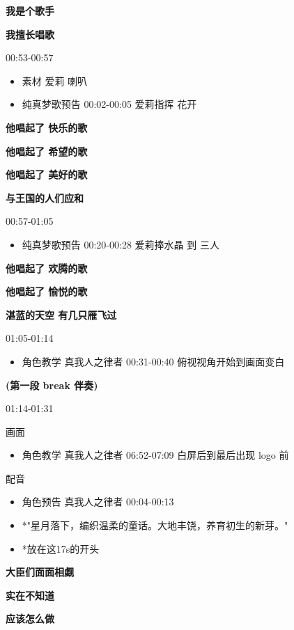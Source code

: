 \documentclass[a4paper]{article}
\begin{document}
\textbf{我是个歌手}

\textbf{我擅长唱歌}

00:53-00:57

\begin{itemize}
    \item 素材 爱莉 喇叭
    \item 纯真梦歌预告 00:02-00:05 爱莉指挥 花开
\end{itemize}

\textbf{他唱起了 快乐的歌}

\textbf{他唱起了 希望的歌}

\textbf{他唱起了 美好的歌}

\textbf{与王国的人们应和}

00:57-01:05

\begin{itemize}
    \item 纯真梦歌预告 00:20-00:28 爱莉捧水晶 到 三人
\end{itemize}

\textbf{他唱起了 欢腾的歌}

\textbf{他唱起了 愉悦的歌}

\textbf{湛蓝的天空 有几只雁飞过}

01:05-01:14

\begin{itemize}
    \item 角色教学 真我人之律者 00:31-00:40 俯视视角开始到画面变白
\end{itemize}

\textbf{(第一段 break 伴奏)}

01:14-01:31

画面

\begin{itemize}
    \item 角色教学 真我人之律者 06:52-07:09 白屏后到最后出现 logo 前
\end{itemize}

配音

\begin{itemize}
    \item 角色预告 真我人之律者 00:04-00:13
    \item *"星月落下，编织温柔的童话。大地丰饶，养育初生的新芽。"
    \item *放在这17s的开头
\end{itemize}

\textbf{大臣们面面相觑}

\textbf{实在不知道}

\textbf{应该怎么做}
\end{document}
